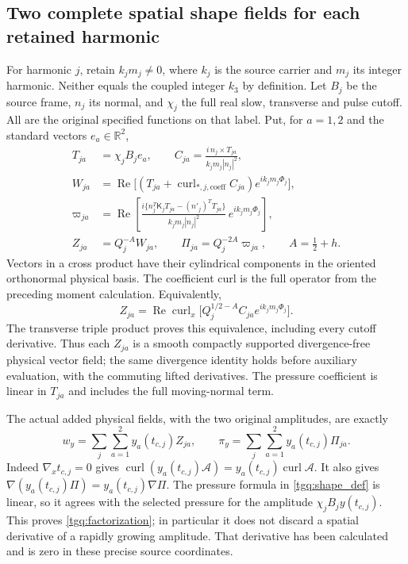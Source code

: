 \subsection{Two complete spatial shape fields for each retained harmonic}
\label{tgq:shapes}
For harmonic $j$, retain $k_jm_j\ne0$, where $k_j$ is the source
carrier and $m_j$ its integer harmonic. Neither equals the coupled
integer $k_3$ by definition. Let $B_j$ be the source frame, $n_j$ its
normal, and $\chi_j$ the full real slow, transverse and pulse cutoff.
All are the original specified functions on that label. Put, for
$a=1,2$ and the standard vectors $e_a\in\mathbb R^2$,
\begin{equation}
 \begin{split}
 T_{ja}&=\chi_jB_je_a,\qquad
 C_{ja}=\frac{i\,n_j\times T_{ja}}{k_jm_j|n_j|^2},\\
 W_{ja}&=\operatorname{Re}
       \bigl[(T_{ja}+\operatorname{curl}_{*,j,\mathrm{coeff}}C_{ja})
                              e^{ik_jm_j\Phi_j}\bigr],\\
 \varpi_{ja}
  &=\operatorname{Re}\left[
    \frac{i\{n_j^T\mathsf K_jT_{ja}-(n'_j)^TT_{ja}\}}
                {k_jm_j|n_j|^2}\,e^{ik_jm_j\Phi_j}\right],\\
 Z_{ja}&=Q_j^{-A}W_{ja},\qquad
 \Pi_{ja}=Q_j^{-2A}\varpi_{ja},\qquad A=\tfrac12+h .
 \end{split}\label{tgq:shape_def}
\end{equation}
Vectors in a cross product have their cylindrical components in the
oriented orthonormal physical basis. The coefficient curl is the full
operator from the preceding moment calculation. Equivalently,
\[
 Z_{ja}=\operatorname{Re}\operatorname{curl}_x
      \bigl[Q_j^{1/2-A}C_{ja}e^{ik_jm_j\Phi_j}\bigr].
\]
The transverse triple product proves this equivalence, including every
cutoff derivative. Thus each $Z_{ja}$ is a smooth compactly supported
divergence-free physical vector field; the same divergence identity
holds before auxiliary evaluation, with the commuting lifted
derivatives. The pressure coefficient is linear in $T_{ja}$ and includes
the full moving-normal term.

The actual added physical fields, with the two original amplitudes,
are exactly
\begin{equation}
 w_y=\sum_j\sum_{a=1}^2 y_a(t_{c,j}) Z_{ja},\qquad
 \pi_y=\sum_j\sum_{a=1}^2 y_a(t_{c,j})\Pi_{ja}.
 \label{tgq:factorization}
\end{equation}
Indeed $\nabla_xt_{c,j}=0$ gives
$\operatorname{curl}(y_a(t_{c,j})\mathcal A)=
y_a(t_{c,j})\operatorname{curl}\mathcal A$. It also gives
$\nabla(y_a(t_{c,j})\Pi)=y_a(t_{c,j})\nabla\Pi$.
The pressure formula in \eqref{tgq:shape_def} is linear, so it agrees
with the selected pressure for the amplitude $\chi_jB_jy(t_{c,j})$.
This proves \eqref{tgq:factorization}; in particular it does not discard
a spatial derivative of a rapidly growing amplitude. That derivative
has been calculated and is zero in these precise source coordinates.

